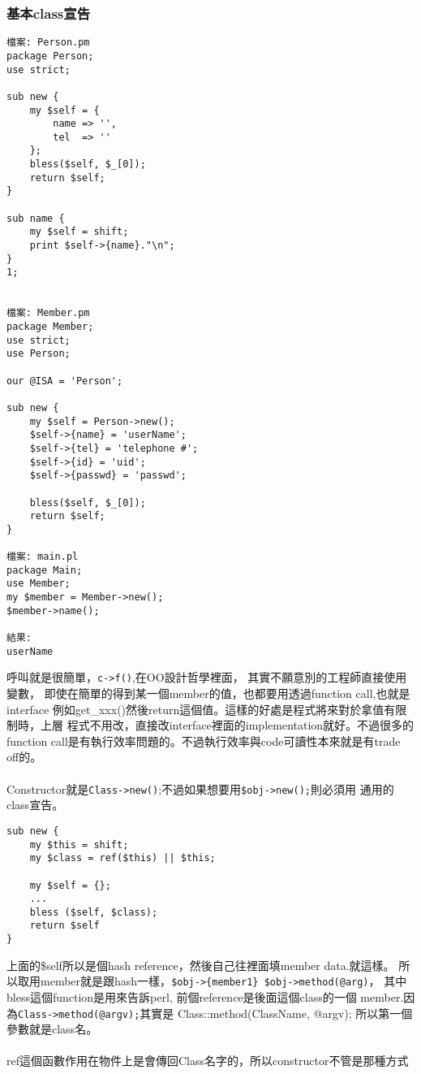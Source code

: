     \subsubsection{基本class宣告}
    \begin{verbatim}
檔案: Person.pm
package Person;
use strict;

sub new {
    my $self = {
        name => '',
        tel  => ''
    };
    bless($self, $_[0]);
    return $self;
}

sub name {
    my $self = shift;
    print $self->{name}."\n";
}
1;


檔案: Member.pm
package Member;
use strict;
use Person;

our @ISA = 'Person';

sub new {
    my $self = Person->new();
    $self->{name} = 'userName';
    $self->{tel} = 'telephone #';
    $self->{id} = 'uid';
    $self->{passwd} = 'passwd';

    bless($self, $_[0]);
    return $self;
}

檔案: main.pl
package Main;
use Member;
my $member = Member->new();
$member->name();

結果:
userName
    \end{verbatim}
    呼叫就是很簡單，\verb=c->f()=,在OO設計哲學裡面，
    其實不願意別的工程師直接使用變數，
    即使在簡單的得到某一個member的值，也都要用透過function call,也就是interface
    例如get\_xxx()然後return這個值。這樣的好處是程式將來對於拿值有限制時，上層
    程式不用改，直接改interface裡面的implementation就好。不過很多的function
    call是有執行效率問題的。不過執行效率與code可讀性本來就是有trade off的。
    \\\\
    Constructor就是\verb=Class->new()=;不過如果想要用\verb=$obj->new();=則必須用
    通用的class宣告。
    \begin{verbatim}
sub new {
    my $this = shift;
    my $class = ref($this) || $this;

    my $self = {};
    ...
    bless ($self, $class);
    return $self
}
    \end{verbatim}
    上面的\$self所以是個hash reference，然後自己往裡面填member data.就這樣。
    所以取用member就是跟hash一樣，\verb=$obj->{member1} $obj->method(@arg)=，
    其中bless這個function是用來告訴perl, 前個reference是後面這個class的一個 
    member.因為\verb=Class->method(@argv);=其實是
    Class::method(ClassName, @argv); 所以第一個參數就是class名。
    \\\\
    ref這個函數作用在物件上是會傳回Class名字的，所以constructor不管是那種方式
